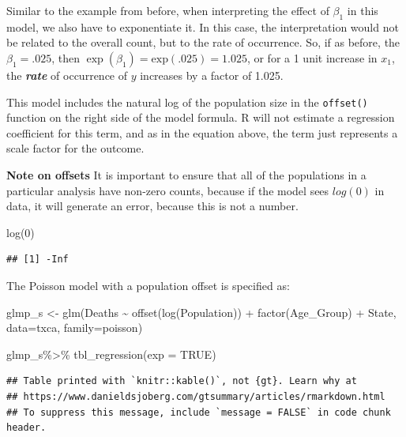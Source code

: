 \documentclass[
]{article}
\newenvironment{Shaded}{\begin{snugshade}}{\end{snugshade}}
\newcommand{\AttributeTok}[1]{\textcolor[rgb]{0.77,0.63,0.00}{#1}}
\newcommand{\ConstantTok}[1]{\textcolor[rgb]{0.00,0.00,0.00}{#1}}
\newcommand{\DecValTok}[1]{\textcolor[rgb]{0.00,0.00,0.81}{#1}}
\newcommand{\FunctionTok}[1]{\textcolor[rgb]{0.00,0.00,0.00}{#1}}
\newcommand{\NormalTok}[1]{#1}
\newcommand{\OtherTok}[1]{\textcolor[rgb]{0.56,0.35,0.01}{#1}}
\newcommand{\SpecialCharTok}[1]{\textcolor[rgb]{0.00,0.00,0.00}{#1}}
\begin{document}
Similar to the example from before, when interpreting the effect of \(\beta_1\) in this model, we also have to exponentiate it. In this case, the interpretation would not be related to the overall count, but to the rate of occurrence. So, if as before, the \(\beta_1 = \text{.025}\), then \(\exp(\beta_1) = \text{exp}(\text{.025}) = \text{1.025}\), or for a 1 unit increase in \(x_1\), the \textbf{\emph{rate}} of occurrence of \(y\) increases by a factor of 1.025.

This model includes the natural log of the population size in the \texttt{offset()} function on the right side of the model formula. R will not estimate a regression coefficient for this term, and as in the equation above, the term just represents a scale factor for the outcome.

\textbf{Note on offsets}
It is important to ensure that all of the populations in a particular analysis have non-zero counts, because if the model sees \(log(0)\) in data, it will generate an error, because this is not a number.

\begin{Shaded}
\begin{Highlighting}[]
\FunctionTok{log}\NormalTok{(}\DecValTok{0}\NormalTok{)}
\end{Highlighting}
\end{Shaded}

\begin{verbatim}
## [1] -Inf
\end{verbatim}

The Poisson model with a population offset is specified as:

\begin{Shaded}
\begin{Highlighting}[]
\NormalTok{glmp\_s }\OtherTok{\textless{}{-}} \FunctionTok{glm}\NormalTok{(Deaths }\SpecialCharTok{\textasciitilde{}} \FunctionTok{offset}\NormalTok{(}\FunctionTok{log}\NormalTok{(Population)) }\SpecialCharTok{+} \FunctionTok{factor}\NormalTok{(Age\_Group) }\SpecialCharTok{+}\NormalTok{ State,}
              \AttributeTok{data=}\NormalTok{txca,}
              \AttributeTok{family=}\NormalTok{poisson)}

\NormalTok{glmp\_s}\SpecialCharTok{\%\textgreater{}\%}
  \FunctionTok{tbl\_regression}\NormalTok{(}\AttributeTok{exp =} \ConstantTok{TRUE}\NormalTok{)}
\end{Highlighting}
\end{Shaded}

\begin{verbatim}
## Table printed with `knitr::kable()`, not {gt}. Learn why at
## https://www.danieldsjoberg.com/gtsummary/articles/rmarkdown.html
## To suppress this message, include `message = FALSE` in code chunk header.
\end{verbatim}
\end{document}
